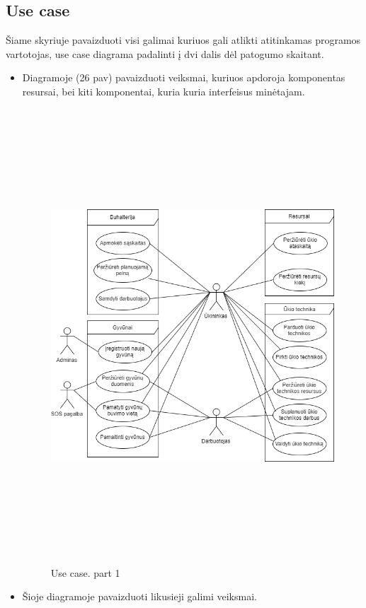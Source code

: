\documentclass[oneside]{VUMIFPSkursinis}
\begin{document}
\subsection{Use case}
Šiame skyriuje pavaizduoti visi galimai kuriuos gali atlikti atitinkamas programos vartotojas, use case diagrama padalinti į dvi dalis dėl patogumo skaitant.
\begin{itemize}
\item Diagramoje (26 pav) pavaizduoti veiksmai, kuriuos apdoroja komponentas resursai, bei kiti komponentai, kuria kuria interfeisus minėtajam.
		\begin{figure}[H]
		\centering	
	\includegraphics[width=15cm,height=17cm,keepaspectratio]{ResursaiUseCase.png}
	\caption{Use case. part 1}
	\label{fig:UseCaseFull}
\end{figure}
\item Šioje diagramoje pavaizduoti likusieji galimi veiksmai.
		\begin{figure}[H]
		\centering	

\end{figure}
\end{itemize}
\end{document}
